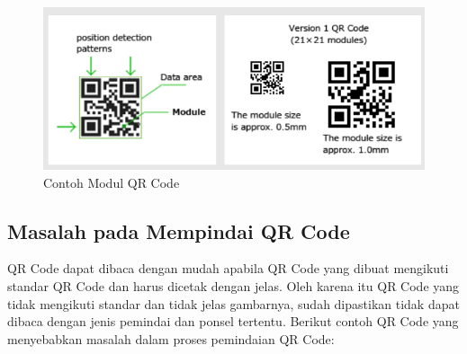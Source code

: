 \begin{figure}[H]
	\centering
	\includegraphics[scale=1]{Gambar/modulSize.png}
	\caption{Contoh Modul QR Code} 
	\label{fig:modulSize}
\end{figure}

\subsection{Masalah pada Mempindai QR Code}
\label{sec:masalahQR}
QR Code dapat dibaca dengan mudah apabila QR Code yang dibuat mengikuti standar QR Code dan harus dicetak dengan jelas. Oleh karena itu QR Code yang tidak mengikuti standar dan tidak jelas gambarnya, sudah dipastikan tidak dapat dibaca dengan jenis pemindai dan ponsel tertentu. Berikut contoh QR Code yang menyebabkan masalah dalam proses pemindaian QR Code:

